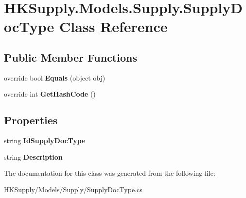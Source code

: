 \hypertarget{class_h_k_supply_1_1_models_1_1_supply_1_1_supply_doc_type}{}\section{H\+K\+Supply.\+Models.\+Supply.\+Supply\+Doc\+Type Class Reference}
\label{class_h_k_supply_1_1_models_1_1_supply_1_1_supply_doc_type}
\subsection*{Public Member Functions}
\begin{DoxyCompactItemize}
\item 
\mbox{\label{class_h_k_supply_1_1_models_1_1_supply_1_1_supply_doc_type_a5f3f91277e5df3b192f307ddc574f654}} 
override bool {\bfseries Equals} (object obj)
\item 
\mbox{\label{class_h_k_supply_1_1_models_1_1_supply_1_1_supply_doc_type_acbb3903bae38e911d366c141f5c1b1b9}} 
override int {\bfseries Get\+Hash\+Code} ()
\end{DoxyCompactItemize}
\subsection*{Properties}
\begin{DoxyCompactItemize}
\item 
\mbox{\label{class_h_k_supply_1_1_models_1_1_supply_1_1_supply_doc_type_a147e8304a292b1f4ddc8b79167578b61}} 
string {\bfseries Id\+Supply\+Doc\+Type}
\item 
\mbox{\label{class_h_k_supply_1_1_models_1_1_supply_1_1_supply_doc_type_ab8e7804c0cf19e3f8863eeef3ce9f345}} 
string {\bfseries Description}
\end{DoxyCompactItemize}


The documentation for this class was generated from the following file\+:\begin{DoxyCompactItemize}
\item 
H\+K\+Supply/\+Models/\+Supply/Supply\+Doc\+Type.\+cs\end{DoxyCompactItemize}
